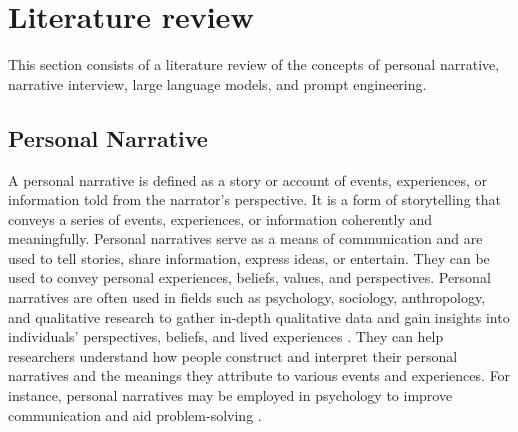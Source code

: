 \chapter{Literature review}
\label{cha:literature_review}
This section consists of a literature review of the concepts of personal narrative, narrative interview, large language models, and prompt engineering. 


\section{Personal Narrative}
A personal narrative is defined as a story or account of events, experiences, or information told from the narrator's perspective. It is a form of storytelling that conveys a series of events, experiences, or information coherently and meaningfully. Personal narratives serve as a means of communication and are used to tell stories, share information, express ideas, or entertain. They can be used to convey personal experiences, beliefs, values, and perspectives. Personal narratives are often used in fields such as psychology, sociology, anthropology, and qualitative research to gather in-depth qualitative data and gain insights into individuals' perspectives, beliefs, and lived experiences \cite{Nurser2018-id,Charon2009-na}. They can help researchers understand how people construct and interpret their personal narratives and the meanings they attribute to various events and experiences. For instance, personal narratives may be employed in psychology to improve communication and aid problem-solving \cite{Kim2015-es}.

